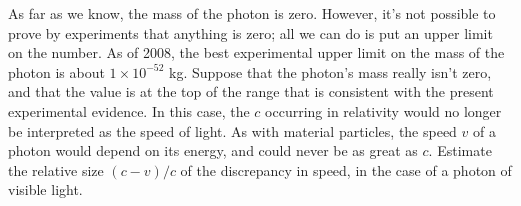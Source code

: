 As far as we know, the mass of the photon is zero. However, it's not possible to prove by experiments that
anything is zero; all we can do is put an upper limit on the number. As of 2008, the best experimental upper limit on
the mass of the photon is about $1\times 10^{-52}$ kg. Suppose that the photon's mass really isn't zero, and that
the value is at the top of the range that is consistent with the present experimental evidence.
In this case, the $c$ occurring in relativity would no longer be interpreted as the speed of light.
As with material particles, the speed $v$ of a photon would depend on its
energy, and could never be as great as $c$. Estimate the relative size $(c-v)/c$ of the discrepancy in speed,
in the case of a photon of visible light.

